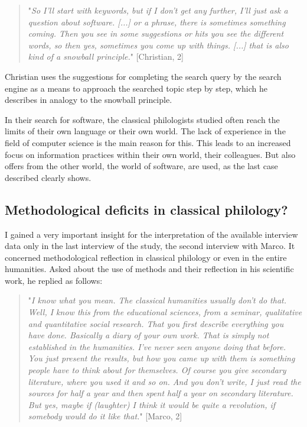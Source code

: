 \documentclass[12pt, a4paper, titlepage, oneside, abstract=true, toc=listof, toc=bibliography, BCOR=1cm]{scrreprt}
\begin{document}
{%
\begin{quotation}
"\textit{So I'll start with keywords, but if I don't get any further, I'll just ask a question about software. [...] or a phrase, there is sometimes something coming. Then you see in some suggestions or hits you see the different words, so then yes, sometimes you come up with things. [...] that is also kind of a snowball principle.}" [Christian, 2]
\end{quotation}

Christian uses the suggestions for completing the search query by the search engine as a means to approach the searched topic step by step, which he describes in analogy to the snowball principle.

In their search for software, the classical philologists studied often reach the limits of their own language or their own world. The lack of experience in the field of computer science is the main reason for this. This leads to an increased focus on information practices within their own world, their colleagues. But also offers from the other world, the world of software, are used, as the last case described clearly shows.

\subsection{Methodological deficits in classical philology?}
\label{sec:method_deficits}
I gained a very important insight for the interpretation of the available interview data only in the last interview of the study, the second interview with Marco. It concerned methodological reflection in classical philology or even in the entire humanities. Asked about the use of methods and their reflection in his scientific work, he replied as follows: 

\begin{quotation}
"\textit{I know what you mean. The classical humanities usually don't do that. Well, I know this from the educational sciences, from a seminar, qualitative and quantitative social research. That you first describe everything you have done. Basically a diary of your own work. That is simply not established in the humanities. I've never seen anyone doing that before. You just present the results, but how you came up with them is something people have to think about for themselves. Of course you give secondary literature, where you used it and so on. And you don't write, I just read the sources for half a year and then spent half a year on secondary literature. But yes, maybe if (laughter) I think it would be quite a revolution, if somebody would do it like that.}" [Marco, 2]
\end{quotation}

}
\end{document}
